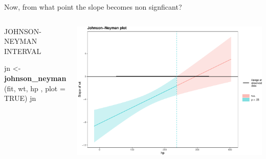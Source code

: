\documentclass[australian,ignorenonframetext,aspectratio=169]{beamer}
\newenvironment{Shaded}{\begin{snugshade}}{\end{snugshade}}
\newcommand{\DataTypeTok}[1]{\textcolor[rgb]{0.13,0.29,0.53}{#1}}
\newcommand{\KeywordTok}[1]{\textcolor[rgb]{0.13,0.29,0.53}{\textbf{#1}}}
\newcommand{\NormalTok}[1]{#1}
\newcommand{\OtherTok}[1]{\textcolor[rgb]{0.56,0.35,0.01}{#1}}
\newcommand{\StringTok}[1]{\textcolor[rgb]{0.31,0.60,0.02}{#1}}
\begin{document}
\begin{frame}[fragile]{Now, from what point the slope becomes non
signficant?}
\protect\hypertarget{now-from-what-point-the-slope-becomes-non-signficant}{}

\begin{columns}[T]
\begin{column}{0.5\textwidth}
\begin{block}{JOHNSON-NEYMAN INTERVAL}

\tiny

\begin{Shaded}
\begin{Highlighting}[]
\NormalTok{jn \textless{}{-}}\StringTok{ }\KeywordTok{johnson\_neyman}\NormalTok{(fit, wt, hp , }\DataTypeTok{plot =} \OtherTok{TRUE}\NormalTok{)}
\NormalTok{jn}
\end{Highlighting}
\end{Shaded}

\end{block}
\end{column}

\begin{column}{0.5\textwidth}
\includegraphics{../graphs/unnamed-chunk-20-1.pdf}
\end{column}
\end{columns}

\end{frame}
\end{document}
